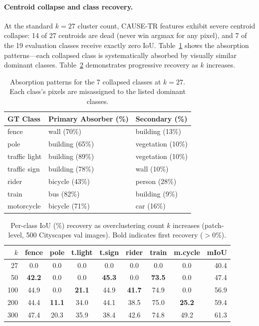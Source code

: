 \documentclass{bmvc2k}
\begin{document}
\paragraph{Centroid collapse and class recovery.}
At the standard $k{=}27$ cluster count, CAUSE-TR features exhibit severe centroid collapse: 14 of 27 centroids are dead (never win argmax for any pixel), and 7 of the 19 evaluation classes receive exactly zero IoU. Table~\ref{tab:absorption} shows the absorption patterns---each collapsed class is systematically absorbed by visually similar dominant classes. Table~\ref{tab:class_recovery} demonstrates progressive recovery as $k$ increases.

\begin{table}[h]
\centering
\caption{Absorption patterns for the 7 collapsed classes at $k{=}27$. Each class's pixels are misassigned to the listed dominant classes.}
\label{tab:absorption}
\small
\begin{tabular}{@{}lll@{}}
\toprule
GT Class & Primary Absorber (\%) & Secondary (\%) \\
\midrule
fence & wall (70\%) & building (13\%) \\
pole & building (65\%) & vegetation (10\%) \\
traffic light & building (89\%) & vegetation (10\%) \\
traffic sign & building (78\%) & wall (10\%) \\
rider & bicycle (43\%) & person (28\%) \\
train & bus (82\%) & building (9\%) \\
motorcycle & bicycle (71\%) & car (16\%) \\
\bottomrule
\end{tabular}
\end{table}

\begin{table}[h]
\centering
\caption{Per-class IoU (\%) recovery as overclustering count $k$ increases (patch-level, 500 Cityscapes val images). Bold indicates first recovery ($>0$\%).}
\label{tab:class_recovery}
\small
\begin{tabular}{@{}rcccccccr@{}}
\toprule
$k$ & fence & pole & t.light & t.sign & rider & train & m.cycle & mIoU \\
\midrule
27 & 0.0 & 0.0 & 0.0 & 0.0 & 0.0 & 0.0 & 0.0 & 40.4 \\
50 & \textbf{42.2} & 0.0 & 0.0 & \textbf{45.3} & 0.0 & \textbf{73.5} & 0.0 & 47.4 \\
100 & 44.9 & 0.0 & \textbf{21.1} & 44.9 & \textbf{41.7} & 74.9 & 0.0 & 56.9 \\
200 & 44.4 & \textbf{11.1} & 34.0 & 44.1 & 38.5 & 75.0 & \textbf{25.2} & 59.4 \\
300 & 47.4 & 20.3 & 35.9 & 38.4 & 42.6 & 74.8 & 49.2 & 61.3 \\
\bottomrule
\end{tabular}
\end{table}
\end{document}
